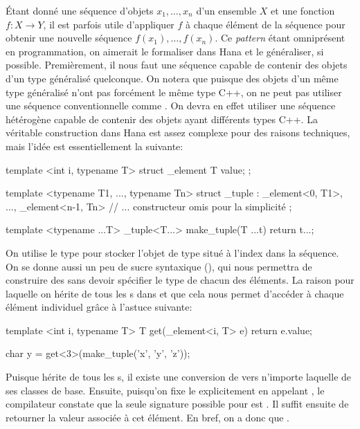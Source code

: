 Étant donné une séquence d'objets $x_1, \hdots, x_n$ d'un ensemble $X$ et une
fonction $f : X \to Y$, il est parfois utile d'appliquer $f$ à chaque élément
de la séquence pour obtenir une nouvelle séquence $f(x_1), \hdots, f(x_n)$.
Ce \textit{pattern} étant omniprésent en programmation, on aimerait le
formaliser dans Hana et le généraliser, si possible. Premièrement, il nous
faut une séquence capable de contenir des objets d'un type généralisé 
quelconque. On notera que puisque des objets d'un même type généralisé n'ont
pas forcément le même type C++, on ne peut pas utiliser une séquence
conventionnelle comme . On devra en effet utiliser une
séquence hétérogène capable de contenir des objets ayant différents types
C++. La véritable construction dans Hana est assez complexe pour des raisons
techniques, mais l'idée est essentiellement la suivante:
\begin{cpp}
    template <int i, typename T>
    struct _element { T value; };

    template <typename T1, ..., typename Tn>
    struct _tuple : _element<0, T1>, ..., _element<n-1, Tn> {
        // ... constructeur omis pour la simplicité
    };

    template <typename ...T>
    _tuple<T...> make_tuple(T ...t) {
        return {t...};
    }
\end{cpp}

On utilise le type  pour stocker l'objet de type 
situé à l'index  dans la séquence. On se donne aussi un peu de sucre
syntaxique (), qui nous permettra de construire des
 sans devoir spécifier le type de chacun des éléments.
La raison pour laquelle on hérite de tous les s dans
 et que cela nous permet d'accéder à chaque élément individuel
grâce à l'astuce suivante:
\begin{cpp}
    template <int i, typename T>
    T get(_element<i, T> e) {
        return e.value;
    }

    char y = get<3>(make_tuple('x', 'y', 'z'));
\end{cpp}

Puisque  hérite de tous les s, il existe une
conversion de  vers n'importe laquelle de ses classes de base.
Ensuite, puisqu'on fixe le  explicitement en appelant ,
le compilateur constate que la seule signature possible pour  est
. Il suffit ensuite de retourner la valeur
associée à cet élément. En bref, on a donc que
.

